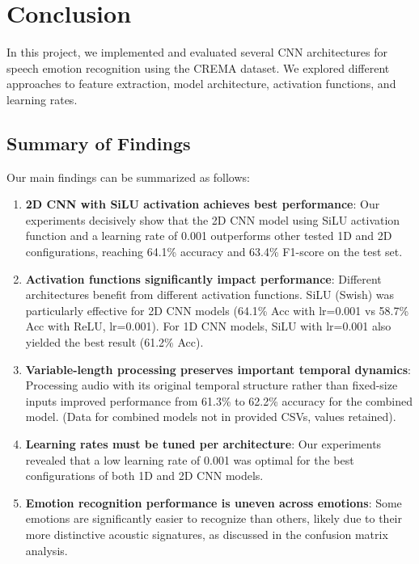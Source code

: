 \section{Conclusion}

In this project, we implemented and evaluated several CNN architectures for speech emotion recognition using the CREMA dataset. We explored different approaches to feature extraction, model architecture, activation functions, and learning rates.

\subsection{Summary of Findings}

Our main findings can be summarized as follows:

\begin{enumerate}
    \item \textbf{2D CNN with SiLU activation achieves best performance}: Our experiments decisively show that the 2D CNN model using SiLU activation function and a learning rate of 0.001 outperforms other tested 1D and 2D configurations, reaching 64.1\% accuracy and 63.4\% F1-score on the test set.
    
    \item \textbf{Activation functions significantly impact performance}: Different architectures benefit from different activation functions. SiLU (Swish) was particularly effective for 2D CNN models (64.1\% Acc with lr=0.001 vs 58.7\% Acc with ReLU, lr=0.001). For 1D CNN models, SiLU with lr=0.001 also yielded the best result (61.2\% Acc).
    
    \item \textbf{Variable-length processing preserves important temporal dynamics}: Processing audio with its original temporal structure rather than fixed-size inputs improved performance from 61.3\% to 62.2\% accuracy for the combined model. (Data for combined models not in provided CSVs, values retained).
    
    \item \textbf{Learning rates must be tuned per architecture}: Our experiments revealed that a low learning rate of 0.001 was optimal for the best configurations of both 1D and 2D CNN models.
    
    \item \textbf{Emotion recognition performance is uneven across emotions}: Some emotions are significantly easier to recognize than others, likely due to their more distinctive acoustic signatures, as discussed in the confusion matrix analysis.
\end{enumerate}

